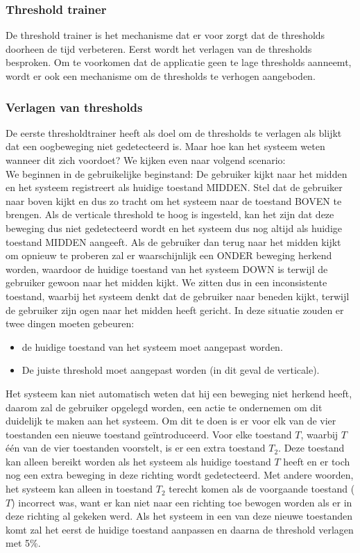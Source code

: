 \documentclass{article}
\begin{document}
\subsubsection{Threshold trainer}
De threshold trainer is het mechanisme dat er voor zorgt dat de thresholds doorheen de tijd verbeteren. Eerst wordt het verlagen van de thresholds besproken. Om te voorkomen dat de applicatie geen te lage thresholds aanneemt, wordt er ook een mechanisme om de thresholds te verhogen aangeboden.
\subsubsection*{Verlagen van thresholds}
De eerste thresholdtrainer heeft als doel om de thresholds te verlagen als blijkt dat een oogbeweging niet gedetecteerd is. Maar hoe kan het systeem weten wanneer dit zich voordoet? We kijken even naar volgend scenario:\\

We beginnen in de gebruikelijke beginstand: De gebruiker kijkt naar het midden en het systeem registreert als huidige toestand MIDDEN. Stel dat de gebruiker naar boven kijkt en dus zo tracht om het systeem naar de toestand BOVEN te brengen. Als de verticale threshold te hoog is ingesteld, kan het zijn dat deze beweging dus niet gedetecteerd wordt en het systeem dus nog altijd als huidige toestand MIDDEN aangeeft. Als de gebruiker dan terug naar het midden kijkt om opnieuw te proberen zal er waarschijnlijk een ONDER beweging herkend worden, waardoor de huidige toestand van het systeem DOWN is terwijl de gebruiker gewoon naar het midden kijkt. We zitten dus in een inconsistente toestand, waarbij het systeem denkt dat de gebruiker naar beneden kijkt, terwijl de gebruiker zijn ogen naar het midden heeft gericht. In deze situatie zouden er twee dingen moeten gebeuren:
\begin{itemize}
	\item de huidige toestand van het systeem moet aangepast worden.
	\item De juiste threshold moet aangepast worden (in dit geval de verticale).
\end{itemize}

Het systeem kan niet automatisch weten dat hij een beweging niet herkend heeft, daarom zal de gebruiker opgelegd worden, een actie te ondernemen om dit duidelijk te maken aan het systeem. Om dit te doen is er voor elk van de vier toestanden een nieuwe toestand geïntroduceerd. Voor elke toestand $T$, waarbij $T$ \'e\'en van de vier toestanden voorstelt, is er een extra toestand $T_2$. Deze toestand kan alleen bereikt worden als het systeem als huidige toestand $T$ heeft en er toch nog een extra beweging in deze richting wordt gedetecteerd.  Met andere woorden, het systeem kan alleen in toestand $T_2$ terecht komen als de voorgaande toestand ($T$) incorrect was, want er kan niet naar een richting toe bewogen worden als er in deze richting al gekeken werd. Als het systeem in een van deze nieuwe toestanden komt zal het eerst de huidige toestand aanpassen en daarna de threshold verlagen met 5\%.\\
\end{document}
